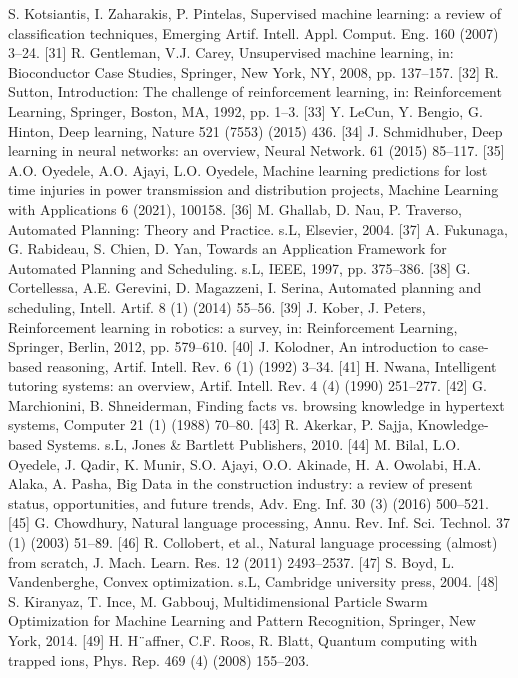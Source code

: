 \documentclass[towcolumn, 11pt]{Article}
\begin{document}
\begin{چکیده}
[30] S. Kotsiantis, I. Zaharakis, P. Pintelas, Supervised machine learning: a review of classification techniques, Emerging Artif. Intell. Appl. Comput. Eng. 160 (2007) 3–24. 
[31] R. Gentleman, V.J. Carey, Unsupervised machine learning, in: Bioconductor Case Studies, Springer, New York, NY, 2008, pp. 137–157. 
[32] R. Sutton, Introduction: The challenge of reinforcement learning, in: Reinforcement Learning, Springer, Boston, MA, 1992, pp. 1–3. 
[33] Y. LeCun, Y. Bengio, G. Hinton, Deep learning, Nature 521 (7553) (2015) 436.
[34] J. Schmidhuber, Deep learning in neural networks: an overview, Neural Network. 61 (2015) 85–117. 
[35] A.O. Oyedele, A.O. Ajayi, L.O. Oyedele, Machine learning predictions for lost time injuries in power transmission and distribution projects, Machine Learning with Applications 6 (2021), 100158. 
[36] M. Ghallab, D. Nau, P. Traverso, Automated Planning: Theory and Practice. s.L, Elsevier, 2004. 
[37] A. Fukunaga, G. Rabideau, S. Chien, D. Yan, Towards an Application Framework for Automated Planning and Scheduling. s.L, IEEE, 1997, pp. 375–386. 
[38] G. Cortellessa, A.E. Gerevini, D. Magazzeni, I. Serina, Automated planning and scheduling, Intell. Artif. 8 (1) (2014) 55–56. 
[39] J. Kober, J. Peters, Reinforcement learning in robotics: a survey, in: Reinforcement Learning, Springer, Berlin, 2012, pp. 579–610. 
[40] J. Kolodner, An introduction to case-based reasoning, Artif. Intell. Rev. 6 (1) (1992) 3–34. 
[41] H. Nwana, Intelligent tutoring systems: an overview, Artif. Intell. Rev. 4 (4) (1990) 251–277. 
[42] G. Marchionini, B. Shneiderman, Finding facts vs. browsing knowledge in hypertext systems, Computer 21 (1) (1988) 70–80. 
[43] R. Akerkar, P. Sajja, Knowledge-based Systems. s.L, Jones & Bartlett Publishers, 2010. 
[44] M. Bilal, L.O. Oyedele, J. Qadir, K. Munir, S.O. Ajayi, O.O. Akinade, H. A. Owolabi, H.A. Alaka, A. Pasha, Big Data in the construction industry: a review of present status, opportunities, and future trends, Adv. Eng. Inf. 30 (3) (2016) 500–521. 
[45] G. Chowdhury, Natural language processing, Annu. Rev. Inf. Sci. Technol. 37 (1) (2003) 51–89. 
[46] R. Collobert, et al., Natural language processing (almost) from scratch, J. Mach. Learn. Res. 12 (2011) 2493–2537. 
[47] S. Boyd, L. Vandenberghe, Convex optimization. s.L, Cambridge university press, 2004. 
[48] S. Kiranyaz, T. Ince, M. Gabbouj, Multidimensional Particle Swarm Optimization for Machine Learning and Pattern Recognition, Springer, New York, 2014. 
[49] H. H¨affner, C.F. Roos, R. Blatt, Quantum computing with trapped ions, Phys. Rep. 469 (4) (2008) 155–203. 

\end{چکیده}
\end{document}
